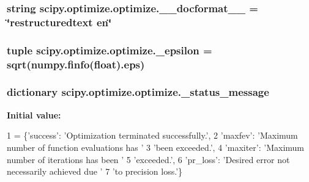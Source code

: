 \subsubsection[{\+\_\+\+\_\+docformat\+\_\+\+\_\+}]{\setlength{\rightskip}{0pt plus 5cm}string scipy.\+optimize.\+optimize.\+\_\+\+\_\+docformat\+\_\+\+\_\+ = \char`\"{}restructuredtext en\char`\"{}}\label{namespacescipy_1_1optimize_1_1optimize_a584735f307f25f012b46ea050e22f455}
\hypertarget{namespacescipy_1_1optimize_1_1optimize_a922ad0329a2cee476aa03d4d9abad53d}{}
\subsubsection[{\+\_\+epsilon}]{\setlength{\rightskip}{0pt plus 5cm}tuple scipy.\+optimize.\+optimize.\+\_\+epsilon = {\bf sqrt}(numpy.\+finfo(float).eps)}\label{namespacescipy_1_1optimize_1_1optimize_a922ad0329a2cee476aa03d4d9abad53d}
\hypertarget{namespacescipy_1_1optimize_1_1optimize_a7693ec03517c99592129c1db84464d17}{}
\subsubsection[{\+\_\+status\+\_\+message}]{\setlength{\rightskip}{0pt plus 5cm}dictionary scipy.\+optimize.\+optimize.\+\_\+status\+\_\+message}\label{namespacescipy_1_1optimize_1_1optimize_a7693ec03517c99592129c1db84464d17}
{\bfseries Initial value\+:}
\begin{DoxyCode}
1 = \{\textcolor{stringliteral}{'success'}: \textcolor{stringliteral}{'Optimization terminated successfully.'},
2                    \textcolor{stringliteral}{'maxfev'}: \textcolor{stringliteral}{'Maximum number of function evaluations has '}
3                               \textcolor{stringliteral}{'been exceeded.'},
4                    \textcolor{stringliteral}{'maxiter'}: \textcolor{stringliteral}{'Maximum number of iterations has been '}
5                               \textcolor{stringliteral}{'exceeded.'},
6                    \textcolor{stringliteral}{'pr\_loss'}: \textcolor{stringliteral}{'Desired error not necessarily achieved due '}
7                               \textcolor{stringliteral}{'to precision loss.'}\}
\end{DoxyCode}
